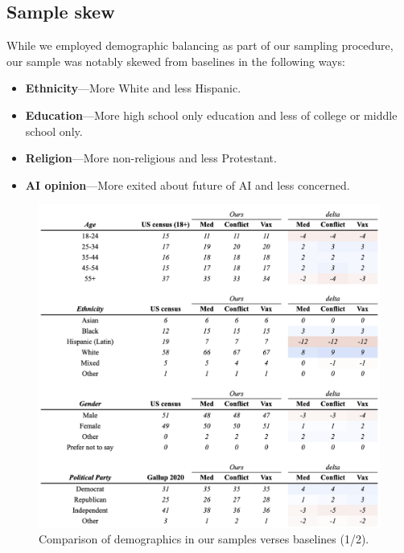 \documentclass{article}
\begin{document}
\subsection{Sample skew}
While we employed demographic balancing as part of our sampling procedure, our sample was notably skewed from baselines in the following ways:
\begin{itemize}
    \item \textbf{Ethnicity}---More White and less Hispanic.
    \item \textbf{Education}---More high school only education and less of college or middle school only.
    \item \textbf{Religion}---More non-religious and less Protestant.
    \item \textbf{AI opinion}---More exited about future of AI and less concerned.
\end{itemize}

\begin{figure}[H]
\centering
\includegraphics[width=1\linewidth]{figs/demos_1.png}
  \caption{Comparison of demographics in our samples verses baselines (1/2).}
  \label{fig:demos 1}
\end{figure}
\end{document}
